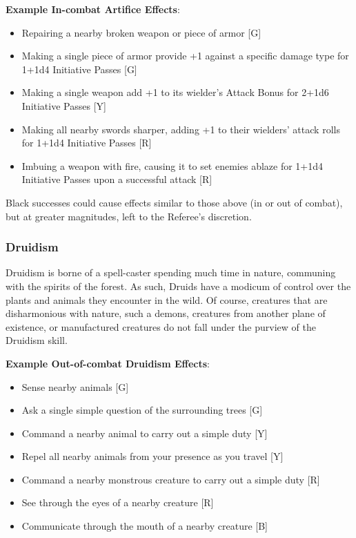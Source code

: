 \documentclass[oneside]{book}
\begin{document}
\begin{multicols}{2}
\textbf{Example In-combat Artifice Effects}: 
	\begin{itemize}
		\setlength{\itemsep}{0cm}%
  		\setlength{\parskip}{0cm}%
  		\item{ \small Repairing a nearby broken weapon or piece of armor [G]}
  		\item{ \small Making a single piece of armor provide +1 against a specific damage type for 1+1d4 Initiative Passes [G]}
  		\item{ \small Making a single weapon add +1 to its wielder's Attack Bonus for 2+1d6 Initiative Passes [Y]}
  		\item{ \small Making all nearby swords sharper, adding +1 to their wielders' attack rolls for 1+1d4 Initiative Passes [R]}
  		\item{ \small Imbuing a weapon with fire, causing it to set enemies ablaze for 1+1d4 Initiative Passes upon a successful attack [R]}
	\end{itemize}
Black successes could cause effects similar to those above (in or out of combat), but at greater magnitudes, left to the Referee's discretion.

\subsubsection{Druidism}
Druidism is borne of a spell-caster spending much time in nature, communing with the spirits of the forest. As such, Druids have a modicum of control over the plants and animals they encounter in the wild. Of course, creatures that are disharmonious with nature, such a demons, creatures from another plane of existence, or manufactured creatures do not fall under the purview of the Druidism skill.

\textbf{Example Out-of-combat Druidism Effects}: 
	\begin{itemize}
		\setlength{\itemsep}{0cm}%
  		\setlength{\parskip}{0cm}%
		\item{ \small Sense nearby animals [G]}
		\item{ \small Ask a single simple question of the surrounding trees [G]}
		\item{ \small Command a nearby animal to carry out a simple duty [Y]}
		\item{ \small Repel all nearby animals from your presence as you travel [Y]}
		\item{ \small Command a nearby monstrous creature to carry out a simple duty [R]}
		\item{ \small See through the eyes of a nearby creature [R]}
		\item{ \small Communicate through the mouth of a nearby creature [B]}
	\end{itemize}
	

\end{multicols}
\end{document}
